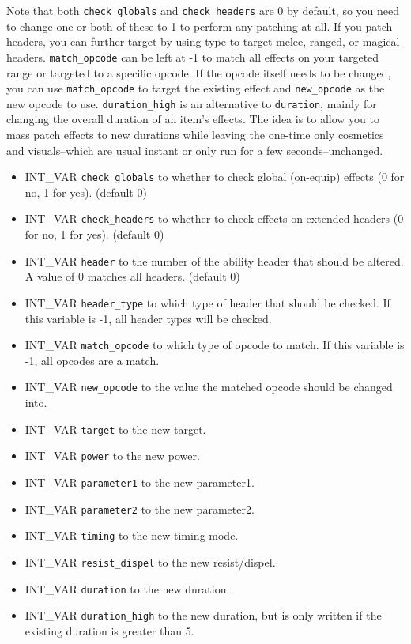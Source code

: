 \documentclass{article}
\begin{document}
Note that both \verb+check_globals+ and \verb+check_headers+ are 0 by default, so you need to change one or both of these to 1 to perform any patching at all. If you patch headers, you can further target by using type to target melee, ranged, or magical headers. \verb+match_opcode+ can be left at -1 to match all effects on your targeted range or targeted to a specific opcode. If the opcode itself needs to be changed, you can use \verb+match_opcode+ to target the existing effect and \verb+new_opcode+ as the new opcode to use. \verb+duration_high+ is an alternative to \verb+duration+, mainly for changing the overall duration of an item's effects. The idea is to allow you to mass patch effects to new durations while leaving the one-time only cosmetics and visuals--which are usual instant or only run for a few seconds--unchanged.
\begin{itemize}
\item INT_VAR \verb+check_globals+ to whether to check global (on-equip) effects (0 for no, 1 for yes). (default 0)
\item INT_VAR \verb+check_headers+ to whether to check effects on extended headers (0 for no, 1 for yes). (default 0)
\item INT_VAR \verb+header+ to the number of the ability header that should be altered. A value of 0 matches all headers. (default 0)
\item INT_VAR \verb+header_type+ to which type of header that should be checked. If this variable is -1, all header types will be checked.
\item INT_VAR \verb+match_opcode+ to which type of opcode to match. If this variable is -1, all opcodes are a match.
\item INT_VAR \verb+new_opcode+ to the value the matched opcode should be changed into.
\item INT_VAR \verb+target+ to the new target.
\item INT_VAR \verb+power+ to the new power.
\item INT_VAR \verb+parameter1+ to the new parameter1.
\item INT_VAR \verb+parameter2+ to the new parameter2.
\item INT_VAR \verb+timing+ to the new timing mode.
\item INT_VAR \verb+resist_dispel+ to the new resist/dispel.
\item INT_VAR \verb+duration+ to the new duration.
\item INT_VAR \verb+duration_high+ to the new duration, but is only written if the existing duration is greater than 5.

\end{itemize}
\end{document}
